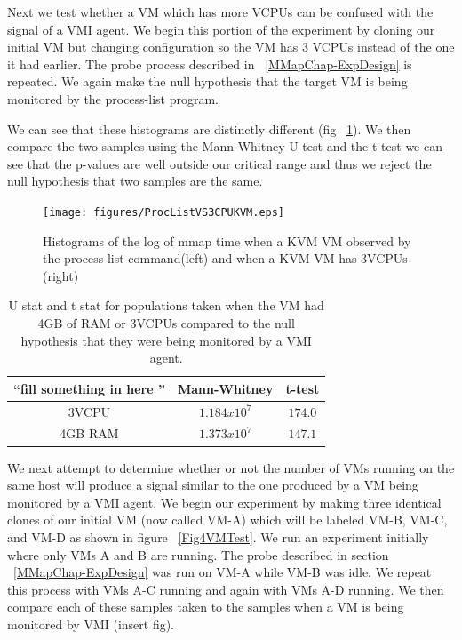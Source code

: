 Next we test whether a VM which has more VCPUs can be confused with the signal of a VMI agent. We begin this portion of the experiment by cloning our initial VM but changing configuration so the VM has 3 VCPUs  instead of the one it had earlier. The probe process described in ~\ref{MMapChap-ExpDesign} is repeated. We again make the null hypothesis that the target VM is being monitored by the process-list program. 

We can see that these histograms are distinctly different (fig ~\ref{KVMMMapVS43VCPU}). We then compare the two samples using the Mann-Whitney U test and the t-test we can see that the p-values are well outside our critical range and thus we reject the null hypothesis that two samples are the same.


	\begin{figure}[p!]\label{KVMMMapVS43VCPU}
	  \centering
	  \texttt{[image: figures/ProcListVS3CPUKVM.eps]}
	  \caption{Histograms of the log of mmap time when a KVM VM observed by the process-list command(left) and when a KVM VM has 3VCPUs (right)}
	\end{figure}


	\begin{table}[p!]\label{TableCPURAM}
		\centering
		\begin{tabular}{| c | c | c |}
			\hline
			 ``fill something in here '' & Mann-Whitney  & t-test  \\ \hline
			3VCPU & $ 1.184x10^{7}$ & $174.0$  \\  \hline
			4GB RAM & $1.373x10^{7} $ & $147.1$   \\  \hline
		\end{tabular}
		\label{MultiCPUsAndRam}
		\caption{U stat and t stat for populations taken when the VM had 4GB of RAM or 3VCPUs compared to the null hypothesis that they were being monitored by a VMI agent.}
	\end{table}

We next attempt to determine whether or not the number of VMs running on the same host will produce a signal similar to the one produced by a VM being monitored by a VMI agent. We begin our experiment by making three identical clones of our initial VM (now called VM-A) which will be labeled VM-B, VM-C, and VM-D as shown in figure ~\ref{Fig4VMTest}. We run an experiment initially where only VMs A and B are running. The probe described in section ~\ref{MMapChap-ExpDesign} was run on VM-A while VM-B was idle. We repeat this process with VMs A-C running and again with VMs A-D running.  We then compare each of these samples taken to the samples when a VM is being monitored by VMI (insert fig). 
	
